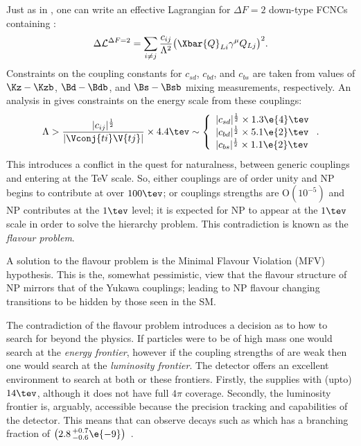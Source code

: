 Just as in , one can write an effective Lagrangian for $\Delta F=2$ down-type
FCNCs containing \np:
\begin{equation}
  \Delta\mathcal{L}^{\Delta F=2} =
  \sum_{i\neq j}\frac{c_{ij}}{\Lambda^2}
  \big(\Xbar{Q}_{Li}\gamma^\mu Q_{Lj}\big)^2.
\end{equation}
Constraints on the coupling constants for $c_{sd}$, $c_{bd}$, and $c_{bs}$ are taken from
values of $\Kz-\Kzb$, $\Bd-\Bdb$, and $\Bs-\Bsb$ mixing measurements, respectively.
An analysis in  gives constraints on the energy scale from these couplings:
\begin{equation}
  \Lambda > \frac{|c_{ij}|^\frac12}{|\Vconj{ti}\V{tj}|}\times4.4\tev
  \sim
  \left\{
    \begin{array}{l}
      |c_{sd}|^\frac12\times 1.3\e{4}\tev \\
      |c_{bd}|^\frac12\times 5.1\e{2}\tev \\
      |c_{bs}|^\frac12\times 1.1\e{2}\tev \\
    \end{array}\right..
\end{equation}
This introduces a conflict in the quest for naturalness, between generic couplings and \np entering
at the TeV scale.
So, either couplings are of order unity and NP begins to contribute at over $100\tev$; or couplings
strengths are $\mathrm{O}(10^{-5})$ and NP contributes at the $1\tev$ level;
it is expected for NP to appear at the $1\tev$ scale in order to solve the hierarchy problem.
This contradiction is known as the \emph{flavour problem}.

A solution to the flavour problem is the Minimal Flavour Violation (MFV) hypothesis.
This is the, somewhat pessimistic, view that the flavour structure of NP mirrors that of the Yukawa
couplings; leading to NP flavour changing transitions to be hidden by those seen in the SM.


The contradiction of the flavour problem introduces a decision as to how to search for beyond the
\sm physics.
If \np particles were to be of high mass one would search at the \emph{energy frontier},
however if the coupling strengths of \np are weak then one would search at the
\emph{luminosity frontier}.
The \lhcb detector offers an excellent environment to search at both or these frontiers.
Firstly, the \lhc supplies \lhcb with (upto) $14\tev$, although it does not have full $4\pi$
coverage.
Secondly, the luminosity frontier is, arguably, accessible because the precision tracking and \pid
capabilities of the \lhcb detector.
This means that \lhcb can observe decays such as \decay{\Bs}{\mumu} which has a branching fraction
of $\big(2.8\,^{+0.7}_{-0.6}\e{-9}\big)$~\cite{LHCb-PAPER-2014-049}.






